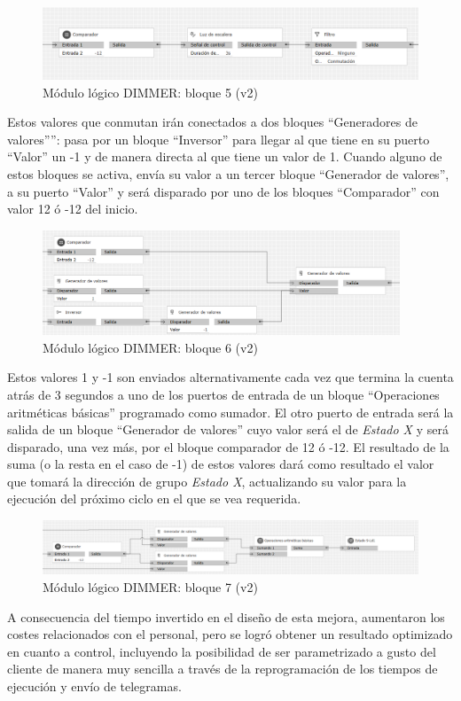 \begin{figure}[H]
\includegraphics[width=1.05\textwidth]{figures/log_dimm_b25.png}  
\caption{Módulo lógico DIMMER: bloque 5 (v2)}
\label{fig:log_dimm_b25}
\end{figure}

Estos valores que conmutan irán conectados a dos bloques “Generadores de valores””: pasa por un bloque “Inversor” para llegar al que tiene en su puerto “Valor” un -1 y de manera directa al que tiene un valor de 1. Cuando alguno de estos bloques se activa, envía su valor a un tercer bloque “Generador de valores”, a su puerto “Valor” y será disparado por uno de los bloques “Comparador” con valor 12 ó -12 del inicio.

\begin{figure}[H]
\centering
\includegraphics[width=0.95\textwidth]{figures/log_dimm_b26.png}  
\caption{Módulo lógico DIMMER: bloque 6 (v2)}
\label{fig:log_dimm_b26}
\end{figure}

Estos valores 1 y -1 son enviados alternativamente cada vez que termina la cuenta atrás de 3 segundos a uno de los puertos de entrada de un bloque “Operaciones aritméticas básicas” programado como sumador. El otro puerto de entrada será la salida de un bloque “Generador de valores” cuyo valor será el de \textit{Estado X} y será disparado, una vez más, por el bloque comparador de 12 ó -12. El resultado de la suma (o la resta en el caso de -1) de estos valores dará como resultado el valor que tomará la dirección de grupo \textit{Estado X}, actualizando su valor para la ejecución del próximo ciclo en el que se vea requerida.

\begin{figure}[H]
\includegraphics[width=1.15\textwidth]{figures/log_dimm_b27.png}  
\caption{Módulo lógico DIMMER: bloque 7 (v2)}
\label{fig:log_dimm_b27}
\end{figure}

A consecuencia del tiempo invertido en el diseño de esta mejora, aumentaron los costes relacionados con el personal, pero se logró obtener un resultado optimizado en cuanto a control, incluyendo la posibilidad de ser parametrizado a gusto del cliente de manera muy sencilla a través de la reprogramación de los tiempos de ejecución y envío de telegramas.

